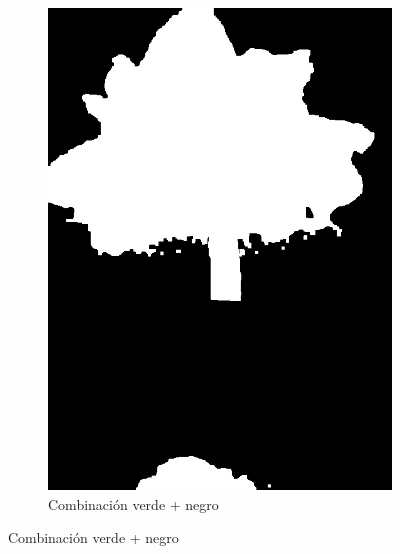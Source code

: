 \begin{figure}[H]
\begin{subfigure}[b]{0.48\textwidth}
    \includegraphics[width=\textwidth]{imagenes/clasificador_4_combinado.jpg}
    \caption{Combinación verde + negro}
\end{subfigure}

\vspace{0.3cm}


\end{figure}
